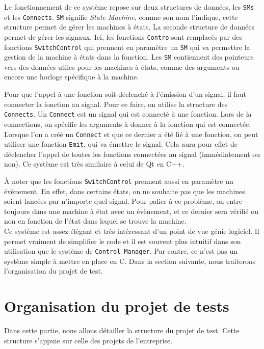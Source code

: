 \documentclass[a4paper]{article}
\begin{document}
Le fonctionnement de ce système repose sur deux structures de données, les
\verb|SMs| et les \verb|Connects|. \verb|SM| signifie \textit{State Machine},
comme son nom l'indique, cette structure permet de gérer les machines à états.
La seconde structure de données permet de gérer les signaux. Ici, les fonctions
\verb|Contro| sont remplacés par des fonctions \verb|SwitchControl| qui prennent
en paramètre un \verb|SM| qui va permettre la gestion de la machine à états dans
la fonction. Les \verb|SM| contiennent des pointeurs vers des données utiles
pour les machines à états, comme des arguments ou encore une horloge spécifique
à la machine.

Pour que l'appel à une fonction soit déclenché à l'émission d'un signal, il faut
connecter la fonction au signal. Pour ce faire, on utilise la structure des
\verb|Connects|. Un \verb|Connect| est un signal qui est connecté à une
fonction. Lors de la connections, on spécifie les arguments à donner à la
fonction qui est connectée. Lorsque l'on a créé un \verb|Connect| et que ce
dernier a été lié à une fonction, on peut utiliser une fonction \verb|Emit|, qui
va émettre le signal. Cela aura pour effet de déclencher l'appel de toutes les
fonctions connectées au signal (immédiatement ou non). Ce système est très
similaire à celui de Qt en C++.

À noter que les fonctions \verb|SwitchControl| prennent aussi en paramètre un
évènement. En effet, dans certains états, on ne souhaite pas que les machines
soient lancées par n'importe quel signal. Pour palier à ce problème, on entre
toujours dans une machine à état avec un évènement, et ce dernier sera vérifié
ou non en fonction de l'état dans lequel se trouve la machine.\\

Ce système est assez élégant et très intéressant d'un point de vue génie
logiciel. Il permet vraiment de simplifier le code et il est souvent plus
intuitif dans son utilisation que le système de \verb|Control Manager|. Par
contre, ce n'est pas un système simple à mettre en place en C. Dans la section
suivante, nous traiterons l'organisation du projet de test.
\section{Organisation du projet de tests}%

Dans cette partie, nous allons détailler la structure du projet de test. Cette
structure s'appuie sur celle des projets de l'entreprise.
\end{document}
